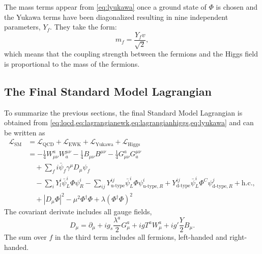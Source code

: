 The mass terms appear from \cref{eq:lyukawa} once a ground state of $\Phi$ is chosen and the Yukawa terms have been diagonalized resulting in nine independent parameters, $Y_f$. 
They take the form:
\begin{equation}
  m_f = \frac{Y_f v}{\sqrt{2}},
\end{equation}
which means that the coupling strength between the fermions and the Higgs field is proportional to the mass of the fermions.


\subsection{The Final Standard Model Lagrangian}
\label{subsec:final-lagrangian}
To summarize the previous sections, the final Standard Model Lagrangian is obtained from \cref{eq:lqcd,eq:lagrangianewk,eq:lagrangianhiggs,eq:lyukawa} and can be written as
\begin{align}
  \mathcal{L}_\text{SM} &= \mathcal{L}_\text{QCD} + \mathcal{L}_\text{EWK} + \mathcal{L}_\text{Yukawa} + \mathcal{L}_\text{Higgs} \\
   &= - \frac{1}{4}W_{\mu\nu}^aW^{\mu\nu}_{a} - \frac{1}{4} B_{\mu\nu}B^{\mu\nu} - \frac{1}{4}G_{\mu\nu}^aG^{\mu\nu}_{a} \\
   & \quad + \sum_f i \bar{\psi}_f\gamma^\mu D_\mu\psi_f \\
   & \quad - \sum_{i} Y_l^i \bar{\psi}^{i}_{L} \Phi \psi^{i}_{R} - \sum_{ij} Y_{\text{u-type}}^{ij} \bar{\psi}^{i}_{L} \Phi \psi^{i}_{\text{u-type},R} + Y_{\text{d-type}}^{ij} \bar{\psi}^{i}_{L} \Phi^C \psi^{j}_{\text{d-type}, R} + \text{h.c.},  \\
   & \quad + |D_\mu\Phi|^2 - \mu^2\Phi^\dagger\Phi + \lambda \left(\Phi^\dagger\Phi \right)^2
\end{align}
The covariant derivate includes all gauge fields,
\begin{equation}
  D_\mu = \partial_\mu + i g_s \frac{\lambda^a}{2} G_\mu^a + igT^aW_\mu^a + ig'\frac{Y}{2}B_\mu.
\end{equation}
The sum over $f$ in the third term includes all fermions, left-handed and right-handed.

